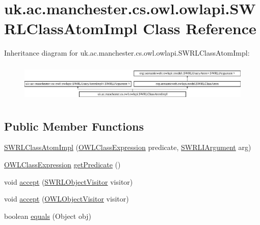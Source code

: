 \hypertarget{classuk_1_1ac_1_1manchester_1_1cs_1_1owl_1_1owlapi_1_1_s_w_r_l_class_atom_impl}{\section{uk.\-ac.\-manchester.\-cs.\-owl.\-owlapi.\-S\-W\-R\-L\-Class\-Atom\-Impl Class Reference}
\label{classuk_1_1ac_1_1manchester_1_1cs_1_1owl_1_1owlapi_1_1_s_w_r_l_class_atom_impl}
}
Inheritance diagram for uk.\-ac.\-manchester.\-cs.\-owl.\-owlapi.\-S\-W\-R\-L\-Class\-Atom\-Impl\-:\begin{figure}[H]
\begin{center}
\leavevmode
\includegraphics[height=1.870824cm]{classuk_1_1ac_1_1manchester_1_1cs_1_1owl_1_1owlapi_1_1_s_w_r_l_class_atom_impl}
\end{center}
\end{figure}
\subsection*{Public Member Functions}
\begin{DoxyCompactItemize}
\item 
\hyperlink{classuk_1_1ac_1_1manchester_1_1cs_1_1owl_1_1owlapi_1_1_s_w_r_l_class_atom_impl_a9c334d354870ba5018e76e5e452f3742}{S\-W\-R\-L\-Class\-Atom\-Impl} (\hyperlink{interfaceorg_1_1semanticweb_1_1owlapi_1_1model_1_1_o_w_l_class_expression}{O\-W\-L\-Class\-Expression} predicate, \hyperlink{interfaceorg_1_1semanticweb_1_1owlapi_1_1model_1_1_s_w_r_l_i_argument}{S\-W\-R\-L\-I\-Argument} arg)
\item 
\hyperlink{interfaceorg_1_1semanticweb_1_1owlapi_1_1model_1_1_o_w_l_class_expression}{O\-W\-L\-Class\-Expression} \hyperlink{classuk_1_1ac_1_1manchester_1_1cs_1_1owl_1_1owlapi_1_1_s_w_r_l_class_atom_impl_abd681e1a1e836b280877ee41664949aa}{get\-Predicate} ()
\item 
void \hyperlink{classuk_1_1ac_1_1manchester_1_1cs_1_1owl_1_1owlapi_1_1_s_w_r_l_class_atom_impl_a091ea8eed16971ec4e6edfa0a9d53ae3}{accept} (\hyperlink{interfaceorg_1_1semanticweb_1_1owlapi_1_1model_1_1_s_w_r_l_object_visitor}{S\-W\-R\-L\-Object\-Visitor} visitor)
\item 
void \hyperlink{classuk_1_1ac_1_1manchester_1_1cs_1_1owl_1_1owlapi_1_1_s_w_r_l_class_atom_impl_a0ea55150f9bc0cb55845573016b8227b}{accept} (\hyperlink{interfaceorg_1_1semanticweb_1_1owlapi_1_1model_1_1_o_w_l_object_visitor}{O\-W\-L\-Object\-Visitor} visitor)
\item 
boolean \hyperlink{classuk_1_1ac_1_1manchester_1_1cs_1_1owl_1_1owlapi_1_1_s_w_r_l_class_atom_impl_ae77a8e886499b7c7d0a216215be85903}{equals} (Object obj)
\end{DoxyCompactItemize}
